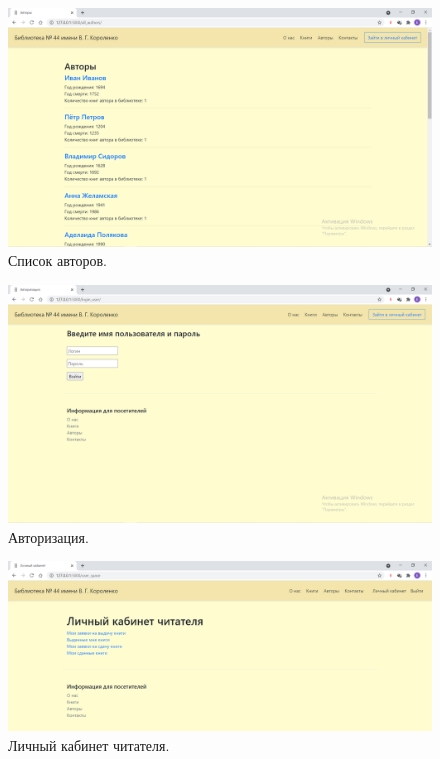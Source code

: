 \begin{figure}[h!]
	\centering
	\includegraphics[scale=0.4]{img/Interface3.png}
	\caption{Список авторов.}
\end{figure}

\begin{figure}[h!]
	\centering
	\includegraphics[scale=0.4]{img/Interface4.png}
	\caption{Авторизация.}
\end{figure}

\begin{figure}[h!]
	\centering
	\includegraphics[scale=0.4]{img/Interface5.png}
	\caption{Личный кабинет читателя.}
\end{figure}

